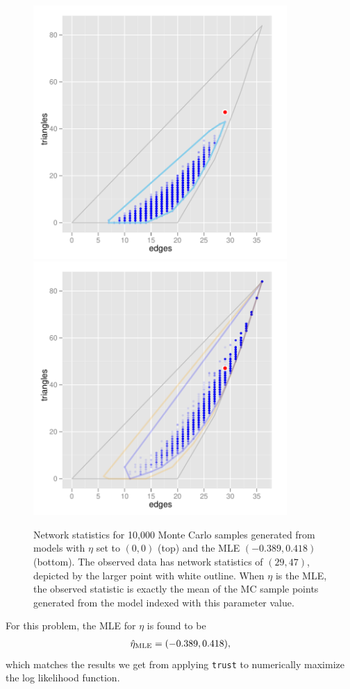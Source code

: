 \begin{figure}[!ht]
\centering
\includegraphics[width=3.8in]{Figures/MCsample-far}
\includegraphics[width=3.8in]{Figures/MCsample-MLE}
\caption[Network statistics for 10,000 Monte Carlo samples when MLE exists]
{Network statistics for 10,000 Monte Carlo samples generated from models 
with $\eta$ set to $(0,0)$ (top) and the MLE $(-0.389, 0.418)$ 
(bottom).  The observed data has network statistics of $(29,47)$, depicted by the 
larger point with white outline.  When $\eta$ is the MLE, the observed statistic is 
exactly the mean of the MC sample points generated from the model indexed with this parameter 
value. }
\label{F:MC cloud}
\end{figure}
For this problem, the MLE for $\eta$ is found to be
\begin{align*}
\hat{\eta}_{\textrm{MLE}} = (-0.389, 0.418),
\end{align*}
which matches the results we get from applying \texttt{trust} to numerically
maximize the log likelihood function.

